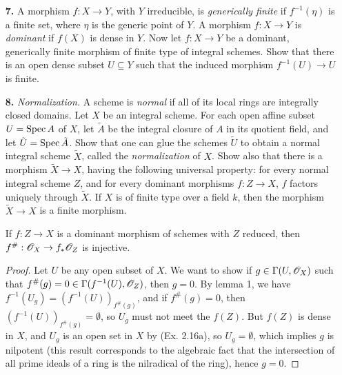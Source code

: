 \documentclass{article}
\begin{document}
\begin{enumerate} [label=\textbf{\arabic*.}, leftmargin=0em]
\item[\textbf{7.}] A morphism $f : X \to Y$, with $Y$ irreducible, is \textit{generically finite} if $f^{-1}(\eta)$ is a finite set, where $\eta$ is the generic point of $Y$. A morphism $f : X \to Y$ is \textit{dominant} if $f(X)$ is dense in $Y$. Now let $f : X \to Y$ be a dominant, generically finite morphism of finite type of integral schemes. Show that there is an open dense subset $U \subseteq Y$ such that the induced morphism $f^{-1}(U) \to U$ is finite.

\item[\textbf{8.}] \textit{Normalization.} A scheme is \textit{normal} if all of its local rings are integrally closed domains. Let $X$ be an integral scheme. For each open affine subset $U = \operatorname{Spec}{A}$ of $X$, let $\tilde{A}$ be the integral closure of $A$ in its quotient field, and let $\tilde{U} = \operatorname{Spec}{\tilde{A}}$. Show that one can glue the schemes $\tilde{U}$ to obtain a normal integral scheme $\tilde{X}$, called the \textit{normalization} of $X$. Show also that there is a morphism $\tilde{X} \to X$, having the following universal property: for every normal integral scheme $Z$, and for every dominant morphisms $f : Z \to X$, $f$ factors uniquely through $\tilde{X}$. If $X$ is of finite type over a field $k$, then the morphism $\tilde{X} \to X$ is a finite morphism.

\begin{lemma}
    If $f : Z \to X$ is a dominant morphism of schemes with $Z$ reduced, then $f^\# : \mathscr{O}_X \to f_* \mathscr{O}_Z$ is injective.    
\end{lemma}

\begin{proof}
    Let $U$ be any open subset of $X$. We want to show if $g \in \Gamma(U, \mathscr{O}_X)$ such that $f^\#(g) = 0 \in \Gamma(f^{-1}(U), \mathscr{O}_Z)$, then $g = 0$. By lemma 1, we have $f^{-1}(U_g) = (f^{-1}(U))_{f^\#(g)}$, and if $f^\#(g) = 0$, then $(f^{-1}(U))_{f^\#(g)} = \emptyset$, so $U_g$ must not meet the $f(Z)$. But $f(Z)$ is dense in $X$, and $U_g$ is an open set in $X$ by (Ex. 2.16a), so $U_g = \emptyset$, which implies $g$ is nilpotent (this result corresponds to the algebraic fact that the intersection of all prime ideals of a ring is the nilradical of the ring), hence $g = 0$.
\end{proof}


\end{enumerate}
\end{document}
